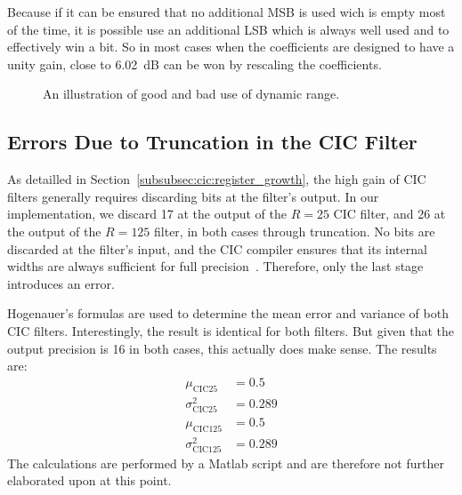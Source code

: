 Because if it can be ensured that no additional MSB is used wich is empty most
of the time,  it is possible use  an additional LSB which is  always well used
and  to effectively  win a  bit. So in  most cases  when the  coefficients are
designed to have a unity gain, close to \SI{6.02}{\dB} can be won by rescaling
the coefficients.

\begin{figure}
    \centering
    
    \caption{An illustration of good and bad use of dynamic range.}
    \label{fig:fpga:dynamicrange}
\end{figure}

%
%
\subsection{Errors Due to Truncation in the CIC Filter} %
\label{subsec:fpga:errors_in_cic_filter}

As detailled in Section~\ref{subsubsec:cic:register_growth},  the high gain of
CIC filters generally requires discarding  bits at the filter's output. In our
implementation,  we discard  \SI{17}{\bit} at  the  output of  the $R=25$  CIC
filter, and \SI{26}{\bit}  at the output of the $R=125$  filter, in both cases
through  truncation. No bits  are discarded  at  the filter's  input, and  the
CIC  compiler ensures  that  its  internal widths  are  always sufficient  for
full  precision~\cite{xilinx:cic-compiler}. Therefore,  only  the  last  stage
introduces an error.

Hogenauer's formulas are used to determine the mean error and variance of both
CIC  filters. Interestingly, the  result  is identical  for both  filters. But
given that the output precision is  \SI{16}{\bit} in both cases, this actually
does make sense. The results are:
\begin{align}
    \mu_\mathrm{CIC25}       &= 0.5 \label{eq:fpga:cic:mu:cic25}  \\
    \sigma^2_\mathrm{CIC25}  &= 0.289\label{eq:fpga:cic:sigmasq:cic25} \\
    \mu_\mathrm{CIC125}      &= 0.5 \label{eq:fpga:cic:mu:cic125} \\
    \sigma^2_\mathrm{CIC125} &= 0.289\label{eq:fpga:cic:sigmasq:cic125}
\end{align}
The  calculations are  performed  by a  Matlab script  and  are therefore  not
further elaborated upon at this point.

